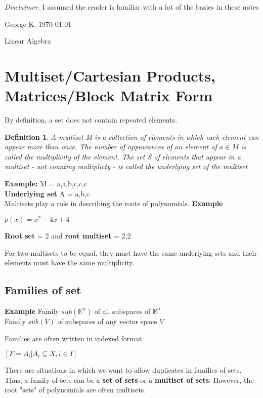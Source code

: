 \documentclass[12pt]{article}
\newcommand{\RR}{\mathbb{R}}
\newcommand{\dis}[1]{\begin{mdframed}\emph{Disclaimer.} #1\end{mdframed}}
\newtheorem{definition}{Definition}
\begin{document}
\thispagestyle{empty}
\color{blue}
\tableofcontents

\dis{I assumed the reader is familiar with a lot of the basics in these notes}
\color{black}
\clearpage


\noindent George K. \hfill \today

\begin{center}
{\large Linear Algebra}
\end{center}

\section{Multiset/Cartesian Products, Matrices/Block Matrix Form}
By definition, a set does not contain repeated elements.
\begin{definition}
A multiset M is a collection of elements in which each element can appear more than once. The number of appearances of an element of $a \in M$ is called the multiplicity of the element. The set S of elements that appear in a multiset - not counting multiplicty - is called the underlying set of the multiset
\end{definition}

\textbf{Example:} M = {a,a,b,c,c,c}\\
\textbf{Underlying set} A = {a,b,c}\\

Multisets play a role in describing the roots of polynomials. \textbf{Example}

\(p(x) = x^{2} - 4x + 4\)

\textbf{Root set} = {2} and \textbf{root multiset} = {2,2}

For two multisets to be equal, they must have the same underlying sets and their elements must have the same multiplicity.


\subsection{Families of set}

\textbf{Example}  Family $sub(\RR^n)$ of all subspaces of $\RR^n$\\
Family $sub(V)$ of subspaces of any vector space $V$

Families are often written in indexed format

\([F = {A_i | A_i \subseteq X ,  i \in I}]\)

There are situations in which we want to allow duplicates in families of sets. Thus, a family of sets can be a \textbf{set of sets} or a \textbf{multiset of sets}. However, the root "sets" of polynomials are often multisets.
\end{document}
